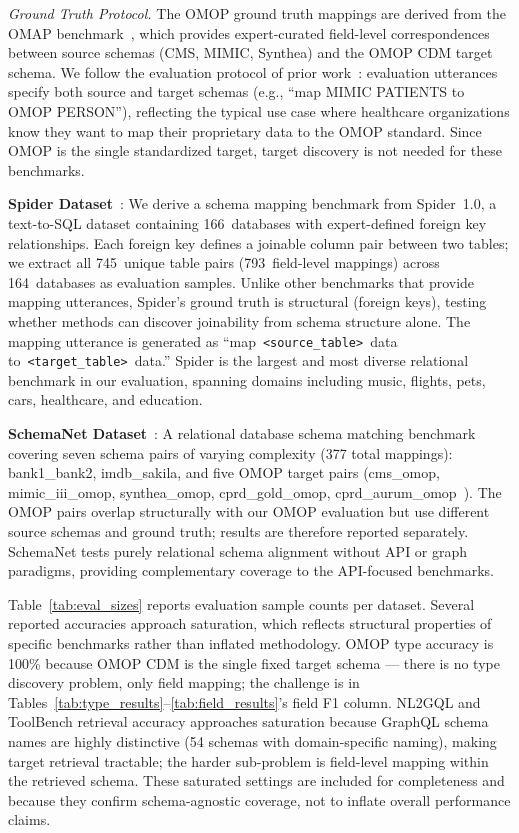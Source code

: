 \documentclass[sigconf, nonacm]{acmart}
\begin{document}
\textit{Ground Truth Protocol.} The OMOP ground truth mappings are derived from the OMAP benchmark~\cite{matchmaker}, which provides expert-curated field-level correspondences between source schemas (CMS, MIMIC, Synthea) and the OMOP CDM target schema. We follow the evaluation protocol of prior work~\cite{matchmaker}: evaluation utterances specify both source and target schemas (e.g., ``map MIMIC PATIENTS to OMOP PERSON''), reflecting the typical use case where healthcare organizations know they want to map their proprietary data to the OMOP standard. Since OMOP is the single standardized target, target discovery is not needed for these benchmarks.

\textbf{Spider Dataset}~\cite{yu2018spider}: We derive a schema mapping benchmark from Spider~1.0, a text-to-SQL dataset containing 166~databases with expert-defined foreign key relationships. Each foreign key defines a joinable column pair between two tables; we extract all 745~unique table pairs (793~field-level mappings) across 164~databases as evaluation samples. Unlike other benchmarks that provide mapping utterances, Spider's ground truth is structural (foreign keys), testing whether methods can discover joinability from schema structure alone. The mapping utterance is generated as ``map~\texttt{<source\_table>}~data to~\texttt{<target\_table>}~data.'' Spider is the largest and most diverse relational benchmark in our evaluation, spanning domains including music, flights, pets, cars, healthcare, and education.

\textbf{SchemaNet Dataset}~\cite{wang2025llmatch}: A relational database schema matching benchmark covering seven schema pairs of varying complexity (377 total mappings): bank1\_bank2, imdb\_sakila, and five OMOP target pairs (cms\_omop, mimic\_iii\_omop, synthea\_omop, cprd\_gold\_omop, cprd\_aurum\_omop~\cite{herrett2015cprd}). The OMOP pairs overlap structurally with our OMOP evaluation but use different source schemas and ground truth; results are therefore reported separately. SchemaNet tests purely relational schema alignment without API or graph paradigms, providing complementary coverage to the API-focused benchmarks.

Table~\ref{tab:eval_sizes} reports evaluation sample counts per dataset. Several reported accuracies approach saturation, which reflects structural properties of specific benchmarks rather than inflated methodology. OMOP type accuracy is 100\% because OMOP CDM is the single fixed target schema — there is no type discovery problem, only field mapping; the challenge is in Tables~\ref{tab:type_results}--\ref{tab:field_results}'s field F1 column. NL2GQL and ToolBench retrieval accuracy approaches saturation because GraphQL schema names are highly distinctive (54 schemas with domain-specific naming), making target retrieval tractable; the harder sub-problem is field-level mapping within the retrieved schema. These saturated settings are included for completeness and because they confirm schema-agnostic coverage, not to inflate overall performance claims.
\end{document}
